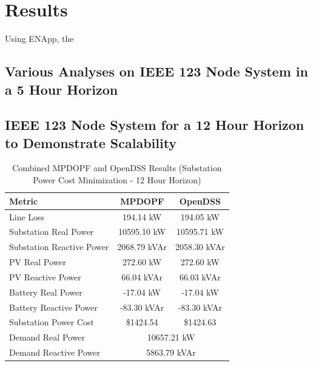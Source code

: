 \documentclass{article}
\begin{document}
\section{Results}

Using ENApp, the 
\subsection*{Various Analyses on IEEE 123 Node System in a 5 Hour Horizon}

\subsection*{IEEE 123 Node System for a 12 Hour Horizon to Demonstrate Scalability}
\begin{table}[h!]
    \centering
    \caption{Combined MPDOPF and OpenDSS Results (Substation Power Cost Minimization - 12 Hour Horizon)}
    \begin{tabular}{|l|c|c|}
    \hline
    \textbf{Metric} & \textbf{MPDOPF} & \textbf{OpenDSS} \\ \hline
    Line Loss & 194.14 kW & 194.05 kW \\ \hline
    Substation Real Power & 10595.10 kW & 10595.71 kW \\ \hline
    Substation Reactive Power & 2068.79 kVAr & 2058.30 kVAr \\ \hline
    PV Real Power & 272.60 kW & 272.60 kW \\ \hline
    PV Reactive Power & 66.04 kVAr & 66.03 kVAr \\ \hline
    Battery Real Power & -17.04 kW & -17.04 kW \\ \hline
    Battery Reactive Power & -83.30 kVAr & -83.30 kVAr \\ \hline
    Substation Power Cost & \$1424.54 & \$1424.63 \\ \hline
    Demand Real Power & \multicolumn{2}{c|}{10657.21 kW} \\ \hline
    Demand Reactive Power & \multicolumn{2}{c|}{5863.79 kVAr} \\ \hline
    \end{tabular}
    \label{table:combined_results_slim}
\end{table}
    
\end{document}
